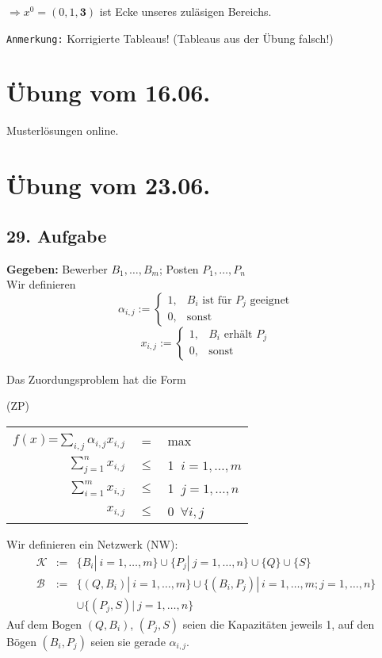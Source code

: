 \documentclass[a4paper,11pt,twoside,titlepage]{article}
\newcommand{\K}{{\mathcal K}}
\newcommand{\B}{{\mathcal B}}
\begin{document}
$\Rightarrow x^0=(0,1,\mathbf{3})$ ist Ecke unseres zuläsigen Bereichs.

\texttt{Anmerkung:} Korrigierte Tableaus! (Tableaus aus der Übung falsch!)

\newpage
\section{Übung vom 16.06.}
Musterlösungen online.

\newpage
\section{Übung vom 23.06.}

\subsection*{29. Aufgabe}

\textbf{Gegeben:} Bewerber $B_1,\ldots,B_m$; Posten $P_1,\ldots,P_n$\\
Wir definieren
\[ \alpha_{i,j}:=\begin{cases}1, &B_i\mbox{ ist für }P_j \mbox{ geeignet}\\0,&\mbox{sonst}\end{cases} \]
\[ x_{i,j}:=\begin{cases}1, &B_i\mbox{ erhält } P_j\\0,&\mbox{sonst}\end{cases} \]

Das Zuordungsproblem hat die Form

\begin{center}
(ZP)\begin{tabular}{|rcl|}\hline
$f(x)$=$\sum\limits_{i,j}\alpha_{i,j}x_{i,j}$&=&max\\
$\sum\limits_{j=1}^nx_{i,j}$&$\le$&1 $\ i=1,\ldots,m$ \\
$\sum\limits_{i=1}^mx_{i,j}$&$\le$&1 $\ j=1,\ldots,n$\\
$x_{i,j}$&$\le$&0\ $\forall i,j$\\\hline
\end{tabular}
\end{center}

Wir definieren ein Netzwerk (NW):
\begin{eqnarray*} \K&:=&\{B_i|\ i=1,\ldots,m\}\cup\{P_j|\ j=1,\ldots,n\}\cup\{Q\}\cup\{S\} \\
\B&:=&\{(Q,B_i)|\ i=1,\ldots,m\}\cup\{(B_i,P_j)|\ i=1,\ldots,m; j=1,\ldots,n\}\\&&\cup\{(P_j,S)|\ j=1,\ldots,n\} \end{eqnarray*}
Auf dem Bogen $(Q,B_i)$, $(P_j,S)$ seien die Kapazitäten jeweils 1, auf den Bögen $(B_i,P_j)$ seien sie gerade $\alpha_{i,j}$.
\end{document}

